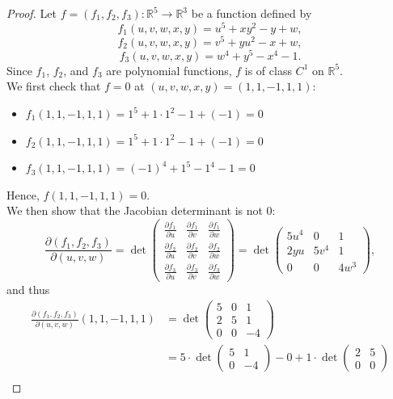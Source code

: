 \begin{proof}
    Let  $f = (f_1, f_2, f_3): \mathbb{R}^5 \to \mathbb{R}^3$ be a function defined by
    \[
    f_1(u, v, w, x, y) = u^5 + xy^2 - y + w,
    \]
    \[
    f_2(u, v, w, x, y) = v^5 + yu^2 - x + w,
    \]
    \[
    f_3(u, v, w, x, y) = w^4 + y^5 - x^4 - 1.
    \]
    Since $f_1$, $f_2$, and $f_3$ are polynomial functions, $f$ is of class $C^1$ on $\mathbb{R}^5$.\\    
    We first check that $f=0$ at $(u, v, w, x, y) = (1, 1, -1, 1, 1)$:
    \begin{itemize}
        \item $f_1(1, 1, -1, 1, 1) = 1^5 + 1 \cdot 1^2 - 1 + (-1) = 0$
        \item $f_2(1, 1, -1, 1, 1) = 1^5 + 1 \cdot 1^2 - 1 + (-1) = 0$
        \item $f_3(1, 1, -1, 1, 1) = (-1)^4 + 1^5 - 1^4 - 1 = 0$
    \end{itemize}
    Hence, $f(1,1,-1,1,1)=0$.\\
    We then show that the Jacobian determinant is not 0:
    \[
    \frac{\partial(f_1, f_2, f_3)}{\partial(u, v, w)} = \det \begin{pmatrix} \frac{\partial f_1}{\partial u} & \frac{\partial f_1}{\partial v} & \frac{\partial f_1}{\partial w} \\ \frac{\partial f_2}{\partial u} & \frac{\partial f_2}{\partial v} & \frac{\partial f_2}{\partial w} \\ \frac{\partial f_3}{\partial u} & \frac{\partial f_3}{\partial v} & \frac{\partial f_3}{\partial w} \end{pmatrix} = \det \begin{pmatrix} 5u^4 & 0 & 1 \\ 2yu & 5v^4 & 1 \\ 0 & 0 & 4w^3 \end{pmatrix},
    \]
    and thus
    \[
    \begin{aligned}
    \frac{\partial(f_1, f_2, f_3)}{\partial(u, v, w)}(1,1,-1,1,1)
    &= \det \begin{pmatrix} 5 & 0 & 1 \\ 2 & 5 & 1 \\ 0 & 0 & -4 \end{pmatrix} \\
    &= 5 \cdot \det\begin{pmatrix} 5 & 1 \\ 0 & -4 \end{pmatrix} - 0 + 1 \cdot \det\begin{pmatrix} 2 & 5 \\ 0 & 0 \end{pmatrix} \\

\end{aligned}\]
\end{proof}
